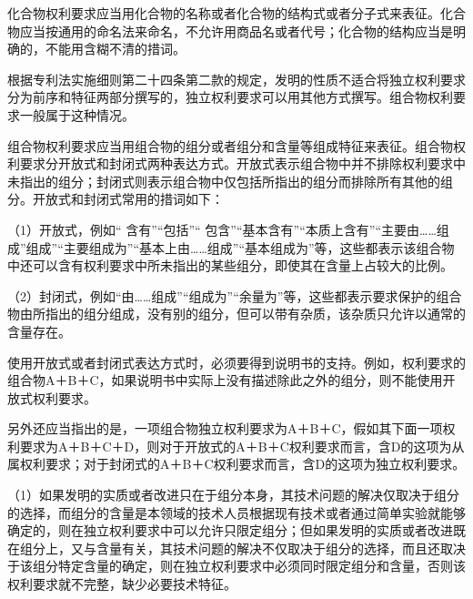 化合物权利要求应当用化合物的名称或者化合物的结构式或者分子式来表征。化合物应当按通用的命名法来命名，不允许用商品名或者代号；化合物的结构应当是明确的，不能用含糊不清的措词。

根据专利法实施细则第二十四条第二款的规定，发明的性质不适合将独立权利要求分为前序和特征两部分撰写的，独立权利要求可以用其他方式撰写。组合物权利要求一般属于这种情况。

组合物权利要求应当用组合物的组分或者组分和含量等组成特征来表征。组合物权利要求分开放式和封闭式两种表达方式。开放式表示组合物中并不排除权利要求中未指出的组分；封闭式则表示组合物中仅包括所指出的组分而排除所有其他的组分。开放式和封闭式常用的措词如下：

{\setlength{\parindent}{17.1bp}（1）开放式，例如“ 含有”“包括”“ 包含”“基本含有”“本质上含有”“主要由……组成”组成”“主要组成为”“基本上由……组成”“基本组成为”等，这些都表示该组合物中还可以含有权利要求中所未指出的某些组分，即使其在含量上占较大的比例。\par}

{\setlength{\parindent}{17.1bp}（2）封闭式，例如“由……组成”“组成为”“余量为”等，这些都表示要求保护的组合物由所指出的组分组成，没有别的组分，但可以带有杂质，该杂质只允许以通常的含量存在。\par}

使用开放式或者封闭式表达方式时，必须要得到说明书的支持。例如，权利要求的组合物A＋B＋C，如果说明书中实际上没有描述除此之外的组分，则不能使用开放式权利要求。

另外还应当指出的是，一项组合物独立权利要求为A＋B＋C，假如其下面一项权利要求为A＋B＋C＋D，则对于开放式的A＋B＋C权利要求而言，含D的这项为从属权利要求；对于封闭式的A＋B＋C权利要求而言，含D的这项为独立权利要求。

{\setlength{\parindent}{17.1bp}（1）如果发明的实质或者改进只在于组分本身，其技术问题的解决仅取决于组分的选择，而组分的含量是本领域的技术人员根据现有技术或者通过简单实验就能够确定的，则在独立权利要求中可以允许只限定组分；但如果发明的实质或者改进既在组分上，又与含量有关，其技术问题的解决不仅取决于组分的选择，而且还取决于该组分特定含量的确定，则在独立权利要求中必须同时限定组分和含量，否则该权利要求就不完整，缺少必要技术特征。\par}

